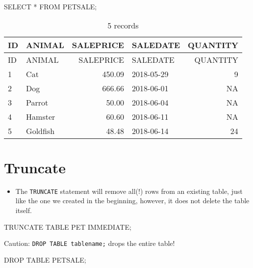 \documentclass[
  letterpaper,
  DIV=11,
  numbers=noendperiod]{scrreprt}
\newenvironment{Shaded}{\begin{snugshade}}{\end{snugshade}}
\newcommand{\KeywordTok}[1]{\textcolor[rgb]{0.00,0.23,0.31}{#1}}
\newcommand{\NormalTok}[1]{\textcolor[rgb]{0.00,0.23,0.31}{#1}}
\newcommand{\OperatorTok}[1]{\textcolor[rgb]{0.37,0.37,0.37}{#1}}
\providecommand{\tightlist}{%
  \setlength{\itemsep}{0pt}\setlength{\parskip}{0pt}}\usepackage{longtable,booktabs,array}
\begin{document}
\begin{Shaded}
\begin{Highlighting}[]
\KeywordTok{SELECT} \OperatorTok{*} \KeywordTok{FROM}\NormalTok{ PETSALE;}
\end{Highlighting}
\end{Shaded}

\begin{longtable}[]{@{}llrlr@{}}
\caption{5 records}\tabularnewline
\toprule()
ID & ANIMAL & SALEPRICE & SALEDATE & QUANTITY \\
\midrule()
\endfirsthead
\toprule()
ID & ANIMAL & SALEPRICE & SALEDATE & QUANTITY \\
\midrule()
\endhead
1 & Cat & 450.09 & 2018-05-29 & 9 \\
2 & Dog & 666.66 & 2018-06-01 & NA \\
3 & Parrot & 50.00 & 2018-06-04 & NA \\
4 & Hamster & 60.60 & 2018-06-11 & NA \\
5 & Goldfish & 48.48 & 2018-06-14 & 24 \\
\bottomrule()
\end{longtable}

\hypertarget{truncate}{%
\section{Truncate}\label{truncate}}

\begin{itemize}
\tightlist
\item
  The \texttt{TRUNCATE} statement will remove all(!) rows from an
  existing table, just like the one we created in the beginning,
  however, it does not delete the table itself.
\end{itemize}

\begin{Shaded}
\begin{Highlighting}[]
\KeywordTok{TRUNCATE} \KeywordTok{TABLE}\NormalTok{ PET }\KeywordTok{IMMEDIATE}\NormalTok{;}
\end{Highlighting}
\end{Shaded}

Caution: \texttt{DROP\ TABLE\ tablename;} drops the entire table!

\begin{Shaded}
\begin{Highlighting}[]
\KeywordTok{DROP} \KeywordTok{TABLE}\NormalTok{ PETSALE;}
\end{Highlighting}
\end{Shaded}
\end{document}
